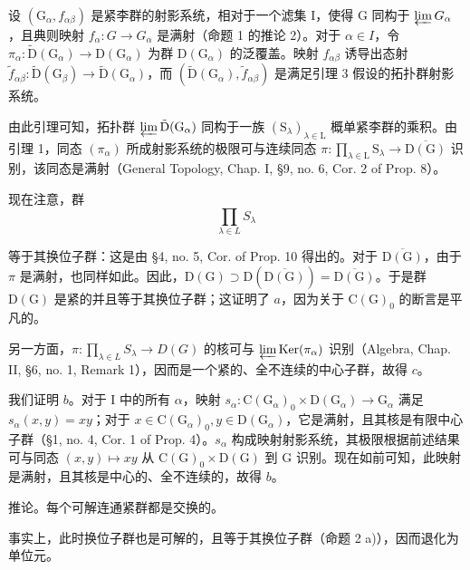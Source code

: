 设 \((\mathrm{G}_{\alpha}, f_{\alpha\beta})\) 是紧李群的射影系统，相对于一个滤集 I，使得 G 同构于 \(\varprojlim G_{\alpha}\)，且典则映射 \(f_{\alpha}: G \to G_{\alpha}\) 是满射（命题 1 的推论 2）。对于 \(\alpha \in I\)，令 \(\pi_{\alpha}: \tilde{\mathrm{D}}(\mathrm{G}_{\alpha}) \to \mathrm{D}(\mathrm{G}_{\alpha})\) 为群 \(\mathrm{D}(\mathrm{G}_{\alpha})\) 的泛覆盖。映射 \(f_{\alpha\beta}\) 诱导出态射 \(\tilde{f}_{\alpha\beta}: \tilde{\mathrm{D}}(\mathrm{G}_{\beta}) \to \tilde{\mathrm{D}}(\mathrm{G}_{\alpha})\)，而 \((\tilde{\mathrm{D}}(\mathrm{G}_{\alpha}), \tilde{f}_{\alpha\beta})\) 是满足引理 3 假设的拓扑群射影系统。

由此引理可知，拓扑群 \(\varprojlim\tilde{\mathrm{D}}(\mathrm{G}_{\alpha})\) 同构于一族 \((\mathrm{S}_{\lambda})_{\lambda\in\mathrm{L}}\) 概单紧李群的乘积。由引理 1，同态 \((\pi_{\alpha})\) 所成射影系统的极限可与连续同态 \(\pi:\prod_{\lambda\in\mathrm{L}}\mathrm{S}_{\lambda}\to\overline{\mathrm{D}(\mathrm{G})}\) 识别，该同态是满射（General Topology, Chap. I, §9, no. 6, Cor. 2 of Prop. 8）。

现在注意，群
\[
\prod_ {\lambda \in L} S _ {\lambda}
\]

等于其换位子群：这是由 §4, no. 5, Cor. of Prop. 10 得出的。对于 \(\overline{\mathrm{D(G)}}\)，由于 \(\pi\) 是满射，也同样如此。因此，\(\mathrm{D(G)} \supset \mathrm{D}(\overline{\mathrm{D(G)}}) = \overline{\mathrm{D(G)}}\)。于是群 \(\mathrm{D(G)}\) 是紧的并且等于其换位子群；这证明了 \(a\)，因为关于 \(\mathrm{C(G)}_0\) 的断言是平凡的。

另一方面，\(\pi : \prod_{\lambda \in L} S_{\lambda} \to D(G)\) 的核可与 \(\varprojlim \operatorname{Ker}(\pi_{\alpha})\) 识别（Algebra, Chap. II, §6, no. 1, Remark 1），因而是一个紧的、全不连续的中心子群，故得 \(c\)。

我们证明 \(b\)。对于 I 中的所有 \(\alpha\)，映射 \(s_{\alpha}: \mathrm{C}(\mathrm{G}_{\alpha})_0 \times \mathrm{D}(\mathrm{G}_{\alpha}) \to \mathrm{G}_{\alpha}\) 满足 \(s_{\alpha}(x,y) = xy\)；对于 \(x \in \mathrm{C}(\mathrm{G}_{\alpha})_0, y \in \mathrm{D}(\mathrm{G}_{\alpha})\)，它是满射，且其核是有限中心子群（§1, no. 4, Cor. 1 of Prop. 4）。\(s_{\alpha}\) 构成映射射影系统，其极限根据前述结果可与同态 \((x,y) \mapsto xy\) 从 \(\mathrm{C}(\mathrm{G})_0 \times \mathrm{D}(\mathrm{G})\) 到 \(\mathrm{G}\) 识别。现在如前可知，此映射是满射，且其核是中心的、全不连续的，故得 \(b\)。

推论。每个可解连通紧群都是交换的。

事实上，此时换位子群也是可解的，且等于其换位子群（命题 2 a)），因而退化为单位元。

